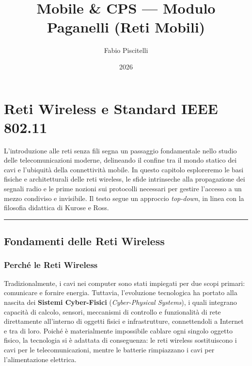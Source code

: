 \documentclass[
  italian,
  openany]{book}
\title{Mobile \& CPS --- Modulo Paganelli (Reti Mobili)}
\author{Fabio Piscitelli}
\date{2026}
\begin{document}
\frontmatter
\maketitle

{
\setcounter{tocdepth}{1}
\tableofcontents
}
\mainmatter
\chapter{Reti Wireless e Standard IEEE
802.11}\label{reti-wireless-e-standard-ieee-802.11}

L'introduzione alle reti senza fili segna un passaggio fondamentale
nello studio delle telecomunicazioni moderne, delineando il confine tra
il mondo statico dei cavi e l'ubiquità della connettività mobile. In
questo capitolo esploreremo le basi fisiche e architetturali delle reti
wireless, le sfide intrinseche alla propagazione dei segnali radio e le
prime nozioni sui protocolli necessari per gestire l'accesso a un mezzo
condiviso e invisibile. Il testo segue un approccio \emph{top-down}, in
linea con la filosofia didattica di Kurose e Ross.

\begin{center}\rule{0.5\linewidth}{0.5pt}\end{center}

\section{Fondamenti delle Reti
Wireless}\label{fondamenti-delle-reti-wireless}

\subsection{Perché le Reti Wireless}\label{perchuxe9-le-reti-wireless}

Tradizionalmente, i cavi nei computer sono stati impiegati per due scopi
primari: comunicare e fornire energia. Tuttavia, l'evoluzione
tecnologica ha portato alla nascita dei \textbf{Sistemi Cyber-Fisici}
(\emph{Cyber-Physical Systems}), i quali integrano capacità di calcolo,
sensori, meccanismi di controllo e funzionalità di rete direttamente
all'interno di oggetti fisici e infrastrutture, connettendoli a Internet
e tra di loro. Poiché è materialmente impossibile cablare ogni singolo
oggetto fisico, la tecnologia si è adattata di conseguenza: le reti
wireless sostituiscono i cavi per le telecomunicazioni, mentre le
batterie rimpiazzano i cavi per l'alimentazione elettrica.
\end{document}

